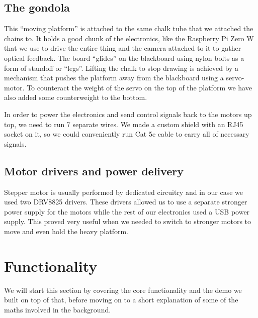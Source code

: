 \documentclass[a4paper,10pt]{article}
\begin{document}
\subsection*{The gondola}
This ``moving platform'' is attached to the same chalk tube that we attached
the chains to.
It holds a good chunk of the electronics, like the Raspberry Pi Zero W
that we use to drive the entire thing and the camera attached to it
to gather optical feedback.
The board ``glides'' on the blackboard using nylon bolts as a form of
standoff or ``legs''.
Lifting the chalk to stop drawing is achieved by a mechanism that pushes the platform away from the
blackboard using a servo-motor.
To counteract the weight of the servo on the top of the platform
we have also added some counterweight to the bottom.

In order to power the electronics and send control signals back to the
motors up top, we need to run 7 separate wires. We made a
custom shield with an RJ45 socket on it, so we could conveniently run Cat 5e
cable to carry all of necessary signals.

\subsection*{Motor drivers and power delivery}

Stepper motor is usually performed by dedicated circuitry and in our case we used two DRV8825 drivers.
These drivers allowed us to use a separate stronger power supply for
the motors while the rest of our electronics used a USB power supply.
This proved very useful when we needed to switch to stronger motors
to move and even hold the heavy platform.

\section{Functionality}
\label{sec:functionality}

We will start this section by covering the core functionality and the
demo we built on top of that, before moving on to a short explanation
of some of the maths involved in the background.
\end{document}
